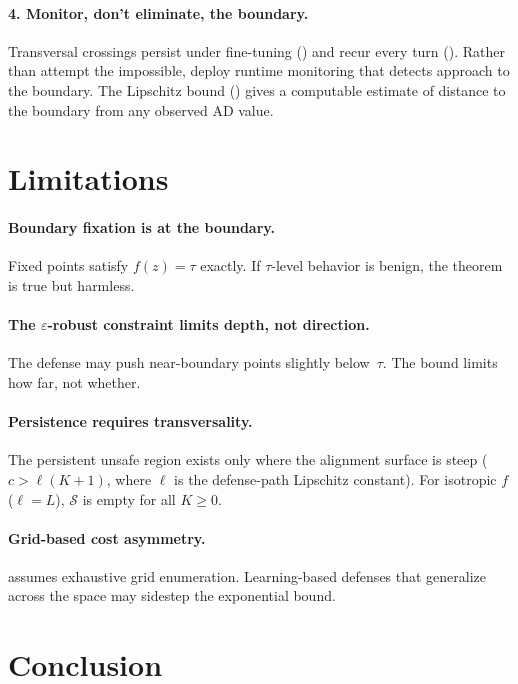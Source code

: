 \documentclass{article}
\begin{document}
\paragraph{4. Monitor, don't eliminate, the boundary.}
Transversal crossings persist under fine-tuning ()
and recur every turn (). Rather than attempt the
impossible, deploy runtime monitoring that detects approach to the
boundary. The Lipschitz bound () gives a
computable estimate of distance to the boundary from any observed AD
value.

\section{Limitations}
\label{sec:limitations}

\paragraph{Boundary fixation is at the boundary.}
Fixed points satisfy $f(z) = \tau$ exactly. If $\tau$-level behavior
is benign, the theorem is true but harmless.

\paragraph{The $\varepsilon$-robust constraint limits depth, not direction.}
The defense may push near-boundary points slightly below~$\tau$. The
bound limits how far, not whether.

\paragraph{Persistence requires transversality.}
The persistent unsafe region exists only where the alignment surface
is steep ($c > \ell(K+1)$, where $\ell$ is the defense-path
Lipschitz constant). For isotropic $f$ ($\ell = L$), $\mathcal{S}$
is empty for all $K \geq 0$.

\paragraph{Grid-based cost asymmetry.}
 assumes exhaustive grid enumeration. Learning-based
defenses that generalize across the space may sidestep the exponential
bound.


\section{Conclusion}
\label{sec:conclusion}
\end{document}
